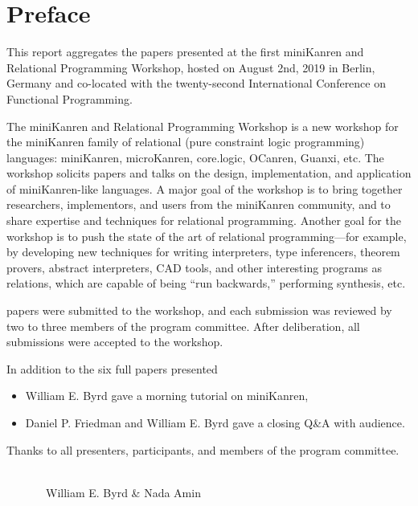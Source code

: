 \documentclass[a4paper]{book}
\date{August 22, 2019}
\author{William E. Byrd \and Nada Amin}
\begin{document}
\frontmatter
\setcounter{page}{3}  %
\chapter*{Preface}
This report aggregates the papers presented at the first miniKanren
and Relational Programming Workshop, hosted on August 2nd, 2019 in
Berlin, Germany and co-located with the twenty-second International
Conference on Functional Programming.

\vspace{5pt}
\noindent
The miniKanren and Relational Programming Workshop is a new workshop for the miniKanren family of relational (pure constraint logic programming) languages: miniKanren, microKanren, core.logic, OCanren, Guanxi, etc. The workshop solicits papers and talks on the design, implementation, and application of miniKanren-like languages. A major goal of the workshop is to bring together researchers, implementors, and users from the miniKanren community, and to share expertise and techniques for relational programming. Another goal for the workshop is to push the state of the art of relational programming—for example, by developing new techniques for writing interpreters, type inferencers, theorem provers, abstract interpreters, CAD tools, and other interesting programs as relations, which are capable of being “run backwards,” performing synthesis, etc.

\vspace{5pt}
 papers were submitted to the workshop, and each submission was reviewed by
two to three members of the program committee.  After deliberation, all submissions
were accepted to the workshop.

\vspace{5pt}
\noindent
In addition to the six full papers  presented
\begin{itemize}
\item William E. Byrd gave a morning tutorial on miniKanren,
\item Daniel P. Friedman and William E. Byrd gave a closing Q\&A with audience.
\end{itemize}

\vspace{5pt}
\noindent
Thanks to all presenters, participants, and members of the
program committee.

\ \\

\ \ \ \ \ \ \ William E. Byrd \& Nada Amin
\end{document}
